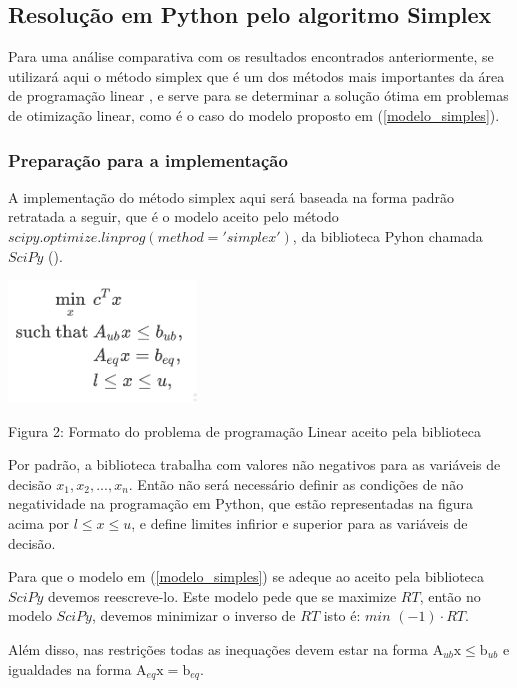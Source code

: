\documentclass[a4paper, 12pt]{article}
\begin{document}
\subsection{Resolução em Python pelo algoritmo Simplex}
Para uma análise comparativa com os resultados encontrados anteriormente, se utilizará aqui o método simplex que é um dos métodos mais importantes da área de programação linear \citep{livro_pesquisa_operacional}, e serve para se determinar a solução ótima em problemas de otimização linear, como é o caso do modelo proposto em (\ref{modelo_simples}).

\subsubsection{Preparação para a implementação}
A implementação do método simplex aqui será baseada na forma padrão retratada a seguir, que é o modelo aceito pelo método $scipy.optimize.linprog(method='simplex')$, da biblioteca Pyhon chamada $SciPy$ (\cite{simplex_scipy}).

\begin{center}
    \includegraphics[width=5cm]{scipy-simplex-formato.PNG}
    
    Figura 2: Formato do problema de programação Linear aceito pela biblioteca
\end{center}

Por padrão, a biblioteca trabalha com valores não negativos para as variáveis de decisão $x_1, x_2, ..., x_n$. Então não será necessário definir as condições de não negatividade na programação em Python, que estão representadas na figura acima por $l\le x\le u$, e define limites infirior e superior para as variáveis de decisão.

Para que o modelo em (\ref{modelo_simples}) se adeque ao aceito pela biblioteca $SciPy$ devemos reescreve-lo. Este modelo pede que se maximize $RT$, então no modelo $SciPy$, devemos minimizar o inverso de $RT$ isto é: $min$ $(-1)\cdot RT$.

Além disso, nas restrições todas as inequações devem estar na forma $\mathrm{A_{\mathit{ub}}\mathrm{x\mathit{\le \mathrm{b\mathit{_{ub}}}}}}$ e igualdades na forma $\mathrm{A_{\mathit{eq}}\mathrm{x\mathit{= \mathrm{b\mathit{_{eq}}}}}}$.
\end{document}
